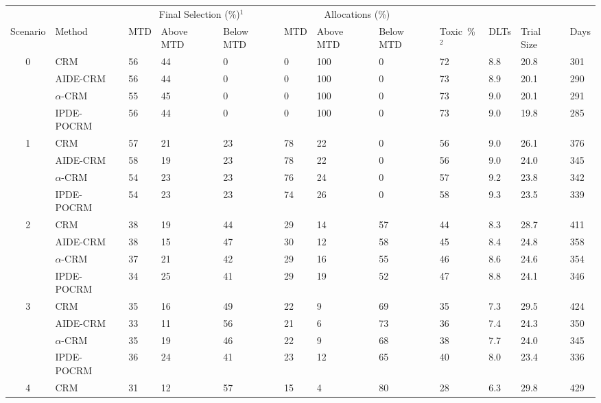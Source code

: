 \begin{tabular*}{\textwidth}{@{\extracolsep\fill}clllllllllll@{\extracolsep\fill}}
\toprule
&  & \multicolumn{3}{c}{Final Selection (\%)$^1$} & \multicolumn{3}{c}{Allocations (\%)} & &  &  &  \\
\multirow{2}{2em}{Scenario} & \multirow{2}{2em}{Method} & \multirow{2}{2em}{MTD} & \multirow{2}{2em}{Above MTD} & \multirow{2}{2em}{Below MTD} & \multirow{2}{2em}{MTD} & \multirow{2}{2em}{Above MTD} & \multirow{2}{2em}{Below MTD} & \multirow{2}{2em}{Toxic~\%$^2$} & \multirow{2}{2em}{DLTs} & \multirow{2}{2em}{Trial Size} & \multirow{2}{2em}{Days}  \\ \\ 
\midrule
\multirow{4}{2em}{0} & CRM & 56 & 44 & 0 & 0 & 100 & 0 & 72 & 8.8 & 20.8 & 301\\
 & AIDE-CRM & 56 & 44 & 0 & 0 & 100 & 0 & 73 & 8.9 & 20.1 & 290\\
 & $\alpha$-CRM & 55 & 45 & 0 & 0 & 100 & 0 & 73 & 9.0 & 20.1 & 291\\
 & IPDE-POCRM & 56 & 44 & 0 & 0 & 100 & 0 & 73 & 9.0 & 19.8 & 285\\
\midrule
\multirow{4}{2em}{1} & CRM & 57 & 21 & 23 & 78 & 22 & 0 & 56 & 9.0 & 26.1 & 376\\
 & AIDE-CRM & 58 & 19 & 23 & 78 & 22 & 0 & 56 & 9.0 & 24.0 & 345\\
 & $\alpha$-CRM & 54 & 23 & 23 & 76 & 24 & 0 & 57 & 9.2 & 23.8 & 342\\
 & IPDE-POCRM & 54 & 23 & 23 & 74 & 26 & 0 & 58 & 9.3 & 23.5 & 339\\
\midrule
\multirow{4}{2em}{2} & CRM & 38 & 19 & 44 & 29 & 14 & 57 & 44 & 8.3 & 28.7 & 411\\
 & AIDE-CRM & 38 & 15 & 47 & 30 & 12 & 58 & 45 & 8.4 & 24.8 & 358\\
 & $\alpha$-CRM & 37 & 21 & 42 & 29 & 16 & 55 & 46 & 8.6 & 24.6 & 354\\
 & IPDE-POCRM & 34 & 25 & 41 & 29 & 19 & 52 & 47 & 8.8 & 24.1 & 346\\
\midrule
\multirow{4}{2em}{3} & CRM & 35 & 16 & 49 & 22 & 9 & 69 & 35 & 7.3 & 29.5 & 424\\
 & AIDE-CRM & 33 & 11 & 56 & 21 & 6 & 73 & 36 & 7.4 & 24.3 & 350\\
 & $\alpha$-CRM & 35 & 19 & 46 & 22 & 9 & 68 & 38 & 7.7 & 24.0 & 345\\
 & IPDE-POCRM & 36 & 24 & 41 & 23 & 12 & 65 & 40 & 8.0 & 23.4 & 336\\
\midrule
\multirow{4}{2em}{4} & CRM & 31 & 12 & 57 & 15 & 4 & 80 & 28 & 6.3 & 29.8 & 429\\

\end{tabular*}
